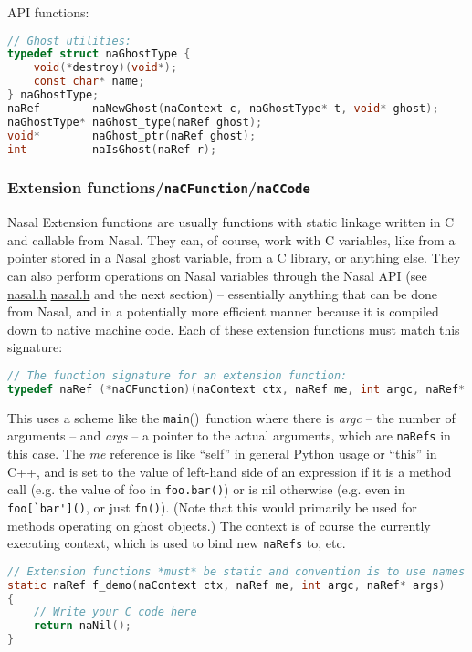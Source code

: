 \documentclass{article}
\newcommand{\todo}[1]{}
\newcommand{\name}[1]{{\it #1}}
\newcommand{\type}[1]{\textcolor{type}{\tt #1}}
\newcommand{\func}[1]{\textcolor{func}{\tt #1}}
\newcommand{\nasalsourcefile}[2][]{%
  \ifthenelse{\isempty{#1}}%
    {%
      \textcolor{source}{%
        \href{https://github.com/andyross/nasal/blob/master/src/#2}{#2}%
      }%
    }%
    {%
      \textcolor{source}{%
        \href{https://github.com/andyross/nasal/blob/master/src/#2\#L#1}{#2}%
      }%
    }%
}
\newcommand{\nasalkeyword}[1]{\textcolor{keyword}{#1}}
\newcommand{\fp}{\textcolor{func}{()}}
\begin{document}
API functions:
\begin{lstlisting}[language=C]
// Ghost utilities:
typedef struct naGhostType {
    void(*destroy)(void*);
    const char* name;
} naGhostType;
naRef        naNewGhost(naContext c, naGhostType* t, void* ghost);
naGhostType* naGhost_type(naRef ghost);
void*        naGhost_ptr(naRef ghost);
int          naIsGhost(naRef r);
\end{lstlisting}

\subsubsection{Extension functions/\type{naCFunction}/\type{naCCode}}
\todo{document existing functions or rather the way they are implemented, standard library ?}
Nasal Extension functions are usually functions with static linkage written in C and callable from Nasal.  They can, of course, work with C variables, like from a pointer stored in a Nasal ghost variable, from a C library, or anything else.  They can also perform operations on Nasal variables through the Nasal API (see \nasalsourcefile{nasal.h} and the next section) -- essentially anything that can be done from Nasal, and in a potentially more efficient manner because it is compiled down to native machine code.  Each of these extension functions must match this signature:

\begin{lstlisting}[language=C]
// The function signature for an extension function:
typedef naRef (*naCFunction)(naContext ctx, naRef me, int argc, naRef* args);
\end{lstlisting}

This uses a scheme like the \func{main}\fp\ function where there is \name{argc} -- the number of arguments -- and \name{args} -- a pointer to the actual arguments, which are \type{naRefs} in this case.  The \name{me} reference is like ``self'' in general Python usage or ``this'' in C++, and is set to the value of left-hand side of an expression if it is a method call (e.g. the value of foo in \verb$foo.bar()$) or is \nasalkeyword{nil} otherwise (e.g. even in \verb$foo[`bar']()$, or just \verb$fn()$).  (Note that this would primarily be used for methods operating on ghost objects.)  The context is of course the currently executing context, which is used to bind new \type{naRefs} to, etc.

\begin{lstlisting}[language=C]
// Extension functions *must* be static and convention is to use names that start with `f_'
static naRef f_demo(naContext ctx, naRef me, int argc, naRef* args)
{
    // Write your C code here
    return naNil();
}
\end{lstlisting}
\end{document}
